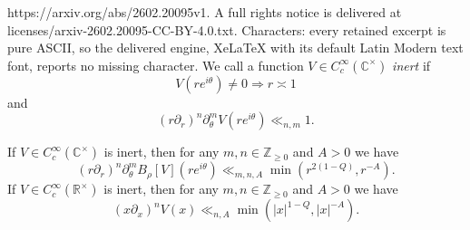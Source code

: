 \documentclass[10pt,a4paper]{amsart}
\newcommand{\CC}{\mathbb{C}}
\newcommand{\R}{\mathbb{R}}
\newcommand{\Z}{\mathbb{Z}}
\begin{document}
https://arxiv.org/abs/2602.20095v1. A full rights notice is delivered at licenses/arxiv-2602.20095-CC-BY-4.0.txt. Characters: every retained excerpt is pure ASCII, so the delivered engine, XeLaTeX with its default Latin Modern text font, reports no missing character.
    We call a function $V\in C_c^{\infty}(\mathbb{C}^{\times})$ \emph{inert} if \[V(re^{i\theta}) \neq 0 \Rightarrow r \asymp 1\] and\begin{equation}\label{eq:inert}(r\partial_r)^n\partial_{\theta}^mV(re^{i\theta}) \ll_{n,m} 1.\end{equation}

\begin{lemma}
If $V \in C_c^{\infty}(\CC^{\times})$ is inert, then for any $m,n \in \Z_{\geq 0}$ and $A>0$ we have
\begin{equation}\label{eq:decaybesselforinert}(r\partial_r)^n\partial_{\theta}^mB_{\rho}[V](re^{i\theta}) \ll_{m,n,A}  \min(r^{2(1-Q)},r^{-A}).\end{equation}
If $V\in C_c^{\infty}(\R^{\times})$ is inert, then for any $m,n \in \Z_{\geq0 }$ and $A>0$ we have 
\begin{equation}\label{eq:decaybesselinert2}
    (x\partial_x)^nV(x) \ll_{n,A} \min(\vert x\vert^{1-Q},\vert x \vert^{-A}).
\end{equation}
\end{lemma}
\end{document}
